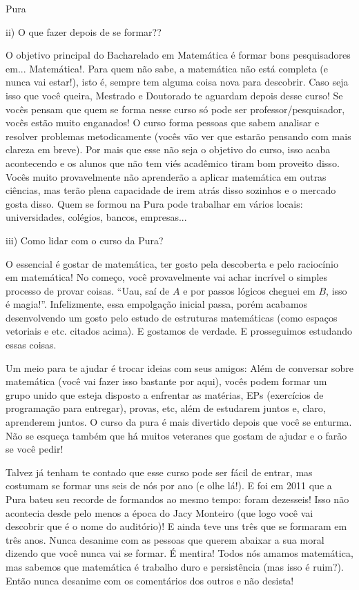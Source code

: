 \begin{subsecao}{Pura}
\begin{itemize}
\end{itemize}

ii) O que fazer depois de se formar??

O objetivo principal do Bacharelado em Matemática é formar bons pesquisadores
em... Matemática!. Para quem não sabe, a matemática não está completa (e nunca
vai estar!), isto é, sempre tem alguma coisa nova para descobrir. Caso seja isso
que você queira, Mestrado e Doutorado te aguardam depois desse curso! Se vocês
pensam que quem se forma nesse curso só pode ser professor/pesquisador, vocês
estão muito enganados! O curso forma pessoas que sabem analisar e resolver problemas
metodicamente (vocês vão ver que estarão pensando com mais clareza em breve). Por
mais que esse não seja o objetivo do curso, isso acaba acontecendo e os alunos
que não tem viés acadêmico tiram bom proveito disso. Vocês muito provavelmente
não aprenderão a aplicar matemática em outras ciências, mas terão plena capacidade
de irem atrás disso sozinhos e o mercado gosta disso. Quem se formou na Pura pode
trabalhar em vários locais: universidades, colégios, bancos, empresas...

iii) Como lidar com o curso da Pura?

O essencial é gostar de matemática, ter gosto pela descoberta e pelo raciocínio
em matemática! No começo, você provavelmente vai achar incrível o simples processo
de provar coisas. ``Uau, saí de $A$ e por passos lógicos cheguei em $B$, isso é
magia!''. Infelizmente, essa empolgação inicial passa, porém acabamos desenvolvendo
um gosto pelo estudo de estruturas matemáticas (como espaços vetoriais e etc.
citados acima). E gostamos de verdade. E prosseguimos estudando essas coisas.

Um meio para te ajudar é trocar ideias com seus amigos: Além de conversar
sobre matemática (você vai fazer isso bastante por aqui), vocês podem formar um
grupo unido que esteja disposto a enfrentar as matérias, EPs (exercícios de
programação para entregar), provas, etc, além de estudarem juntos e, claro,
aprenderem juntos. O curso da pura é mais divertido depois que você se enturma. Não se
esqueça também que há muitos veteranes que gostam de ajudar e o farão se você pedir!

Talvez já tenham te contado que esse curso pode ser fácil de entrar, mas
costumam se formar uns seis de nós por ano (e olhe lá!). E foi em 2011 que a Pura
bateu seu recorde de formandos ao mesmo tempo: foram dezesseis! Isso não acontecia
desde pelo menos a época do Jacy Monteiro (que logo você vai descobrir que é o
nome do auditório)! E ainda teve uns três que se formaram em
três anos. Nunca desanime com as pessoas que querem abaixar a sua moral dizendo
que você nunca vai se formar. É mentira! Todos nós amamos matemática, mas sabemos
que matemática é trabalho duro e persistência (mas isso é ruim?). Então nunca
desanime com os comentários dos outros e não desista!


\end{subsecao}
